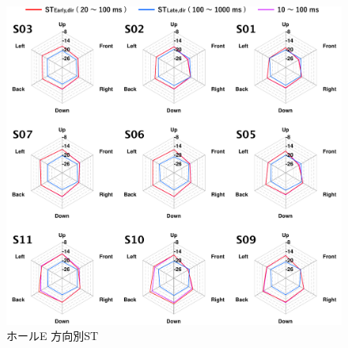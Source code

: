 \documentclass[11pt,a4j]{jreport}
\begin{document}
  \begin{figure}[H]
    \centering
    \includegraphics[scale=.77]{images/realHallDirSt/allPoint/reshaped/e.pdf}
    \caption*{ホールE 方向別ST}
  \end{figure}

  \newpage

  \vspace{4\baselineskip}
  
\end{document}
